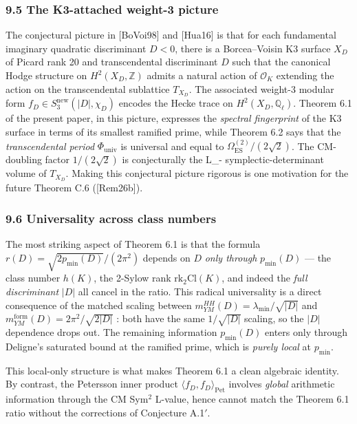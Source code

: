 \documentclass[
  11pt,
  a4paper,
]{amsart}
\begin{document}
\hypertarget{the-k3-attached-weight-3-picture}{%
\subsubsection{9.5 The K3-attached weight-3 picture}\label{the-k3-attached-weight-3-picture}}

The conjectural picture in {[}BoVoi98{]} and {[}Hua16{]} is that for each fundamental imaginary quadratic discriminant \(D < 0\), there is a Borcea--Voisin K3 surface \(X_D\) of Picard rank 20 and transcendental discriminant \(D\) such that the canonical Hodge structure on \(H^{2}(X_D, \mathbb{Z})\) admits a natural action of \(\mathcal{O}_K\) extending the action on the transcendental sublattice \(T_{X_D}\). The associated weight-3 modular form \(f_D \in S_3^{\mathrm{new}}(|D|, \chi_D)\) encodes the Hecke trace on \(H^{2}(X_D, \mathbb{Q}_\ell)\). Theorem 6.1 of the present paper, in this picture, expresses the \emph{spectral fingerprint} of the K3 surface in terms of its smallest ramified prime, while Theorem 6.2 says that the \emph{transcendental period} \(\Phi_{\mathrm{univ}}\) is universal and equal to \(\Omega_{\mathrm{ES}}^{(2)}/(2\sqrt 2)\). The CM-doubling factor \(1/(2\sqrt 2)\) is conjecturally the L\_- symplectic-determinant volume of \(T_{X_D}\). Making this conjectural picture rigorous is one motivation for the future Theorem C.6 ({[}Rem26b{]}).

\hypertarget{universality-across-class-numbers}{%
\subsubsection{9.6 Universality across class numbers}\label{universality-across-class-numbers}}

The most striking aspect of Theorem 6.1 is that the formula \(r(D) = \sqrt{2 p_{\min}(D)}/(2\pi^{2})\) depends on \(D\) \emph{only through} \(p_{\min}(D)\) --- the class number \(h(K)\), the 2-Sylow rank \(\mathrm{rk}_2 \mathrm{Cl}(K)\), and indeed the \emph{full discriminant} \(|D|\) all cancel in the ratio. This radical universality is a direct consequence of the matched scaling between \(m_{YM}^{HH}(D) = \lambda_{\min}/\sqrt{|D|}\) and \(m_{YM}^{\mathrm{form}}(D) = 2\pi^{2}/\sqrt{2|D|}\) : both have the same \(1/\sqrt{|D|}\) scaling, so the \(|D|\) dependence drops out. The remaining information \(p_{\min}(D)\) enters only through Deligne's saturated bound at the ramified prime, which is \emph{purely local} at \(p_{\min}\).

This local-only structure is what makes Theorem 6.1 a clean algebraic identity. By contrast, the Petersson inner product \(\langle f_D, f_D\rangle_{\mathrm{Pet}}\) involves \emph{global} arithmetic information through the CM Sym\(^{2}\) L-value, hence cannot match the Theorem 6.1 ratio without the corrections of Conjecture A.1\('\).
\end{document}
